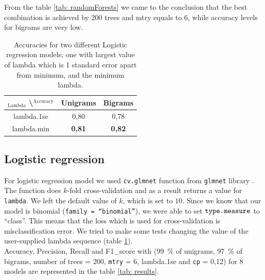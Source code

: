 \documentclass[a4paper,11pt]{article}
\begin{document}
From the table \ref{tab: randomForests} we came to the conclusion that the best combination is achieved by 200 trees and mtry equals to 6, while accuracy levels for bigrams are very low.

\begin{table}[h!]
\centering
\begin{tabular}{c || c | c}
$_{\text{Lambda}}$ \textbackslash $^{\text{Accuracy}}$ & Unigrams & Bigrams \\ \hline \hline
lambda.1se & 0{,}80 & 0{,}78 \\ \hline
lambda.min & \textbf{0{,}81} & \textbf{0{,}82} 
\end{tabular}
\caption{Accuracies for two different Logistic regression models; one with largest value of lambda which is 1 standard error apart from minimum, and the minimum lambda.}
\label{tab: logisticRegression}
\end{table}

\subsection{Logistic regression}

For logistic regression model we used \verb|cv.glmnet| function from \verb|glmnet| library \cite{glmnet}. The function does $k$-fold cross-validation and as a result returns a value for \verb|lambda|. We left the default value of $k$, which is set to $10$. Since we know that our model is binomial (\verb|family = “binomial”|), we were able to set $\verb|type.measure|$ to “class”. This means that the loss which is used for cross-validation is misclassification error. We tried to make some tests changing the value of the user-supplied lambda sequence (table \ref{tab: logisticRegression}). \\

Accuracy, Precision, Recall and F1\_score with (99~\% of unigrams, 97~\% of bigrams, number of trees = 200, \verb|mtry| = 6, lambda.1se and \verb|cp| = 0{,}12) for 8 models are represented in the table \ref{tab: results}.
\end{document}
